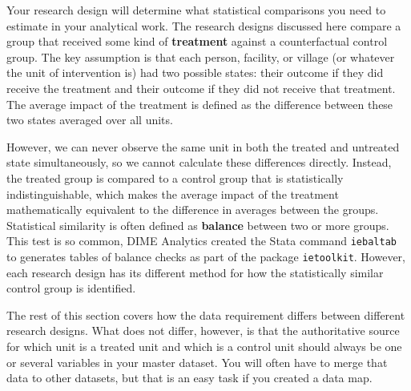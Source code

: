 Your research design will determine what statistical comparisons you need
to estimate in your analytical work.
The research designs discussed here compare a group that received
some kind of \textbf{treatment}
against a counterfactual control group.
The key assumption is that each
person, facility, or village (or whatever the unit of intervention is)
had two possible states: their outcome if they did receive the treatment
and their outcome if they did not receive that treatment.
The average impact of the treatment is defined as
the difference between these two states averaged over all units.

However, we can never observe the same unit
in both the treated and untreated state simultaneously,
so we cannot calculate these differences directly.
Instead, the treated group is compared to a control group
that is statistically indistinguishable,
which makes the average impact of the treatment
mathematically equivalent to the difference in averages between the groups.
Statistical similarity is often defined
as \textbf{balance} between two or more groups.	
This test is so common,	
DIME Analytics created the Stata command \texttt{iebaltab}	
to generates tables of balance checks	
as part of the package \texttt{ietoolkit}.	
However, each research design has its different method	
for how the statistically similar control group is identified.

The rest of this section covers how the data requirement differs 
between different research designs.
What does not differ, however, is that the authoritative source
for which unit is a treated unit and which is a control unit
should always be one or several variables in your master dataset. 
You will often have to merge that data to other datasets, 
but that is an easy task if you created a data map.


